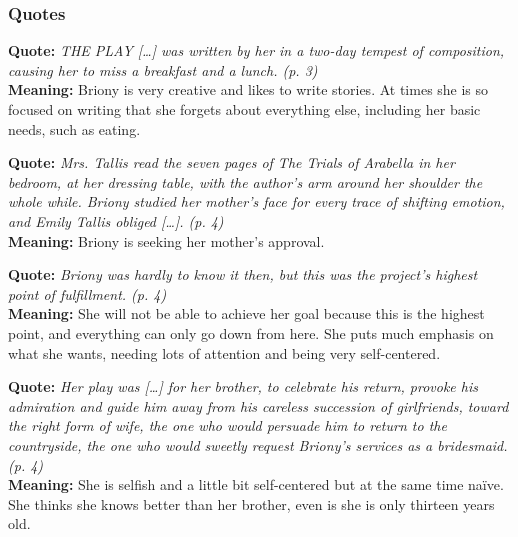 \documentclass[a4paper]{article}
\newcommand*\circled[1]{\tikz[baseline=(char.base)]{
            \node[shape=circle,draw,inner sep=2pt] (char) {#1};}}
\newcommand\hr{\par\vspace{-.5\ht\strutbox}\noindent\hrulefill\par}
\begin{document}
\subsubsection{Quotes}

\begin{minipage}[l]{0.05\textwidth}
    \circled{1}
\end{minipage}
\begin{minipage}[r]{0.95\textwidth}
    \textbf{Quote:} \textit{
        THE PLAY […] was written by her in a two-day tempest of
        composition, causing her to miss a breakfast and a lunch.
        (p. 3)
    }
    \\
    \textbf{Meaning:}
    Briony is very creative and likes to write stories.
    At times she is so focused on writing that she
    forgets about everything else, including her
    basic needs, such as eating.
\end{minipage}
\hr
\begin{minipage}[l]{0.05\textwidth}
    \circled{2}
\end{minipage}
\begin{minipage}[r]{0.95\textwidth}
    \textbf{Quote:} \textit{
        Mrs. Tallis read the seven pages of The Trials of Arabella
        in her bedroom, at her dressing table, with the author's
        arm around her shoulder the whole while. Briony studied
        her mother's face for every trace of shifting emotion, and
        Emily Tallis obliged […]. (p. 4)
    }
    \\
    \textbf{Meaning:} Briony is seeking her mother's approval.
\end{minipage}
\hr
\begin{minipage}[l]{0.05\textwidth}
    \circled{3}
\end{minipage}
\begin{minipage}[r]{0.95\textwidth}
    \textbf{Quote:} \textit{
        Briony was hardly to know it then, but this was the
        project's highest point of fulfillment. (p. 4)
    }
    \\
    \textbf{Meaning:} She will not be able to achieve her goal because this is the highest point,
    and everything can only go down from here. She puts much emphasis on what she wants,
    needing lots of attention and being very self-centered.
\end{minipage}
\hr
\begin{minipage}[l]{0.05\textwidth}
    \circled{4}
\end{minipage}
\begin{minipage}[r]{0.95\textwidth}
    \textbf{Quote:} \textit{
        Her play was […] for her brother, to celebrate his return,
        provoke his admiration and guide him away from his
        careless succession of girlfriends, toward the right form
        of wife, the one who would persuade him to return to the
        countryside, the one who would sweetly request Briony's
        services as a bridesmaid. (p. 4)
    }
    \\
    \textbf{Meaning:} She is selfish and a little bit self-centered but at the same time naïve.
    She thinks she knows better than her brother, even is she is only thirteen years old.
\end{minipage}
\end{document}
